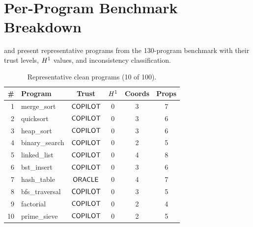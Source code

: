 \documentclass[11pt]{article}
\begin{document}
\appendix
\section{Per-Program Benchmark Breakdown}\label{app:benchmark}

 and 
present representative programs from the 130-program
benchmark with their trust levels, $H^{1}$ values,
and inconsistency classification.

\begin{table}[H]
\centering
\caption{Representative clean programs (10 of 100).}
\label{tab:benchmark-clean}
\small
\begin{tabular}{@{}rlcccc@{}}
\toprule
\textbf{\#} & \textbf{Program} & \textbf{Trust}
  & $H^{1}$ & \textbf{Coords} & \textbf{Props} \\
\midrule
1  & merge\_sort        & $\mathsf{COPILOT}$ & 0 & 3 & 7 \\
2  & quicksort          & $\mathsf{COPILOT}$ & 0 & 3 & 6 \\
3  & heap\_sort          & $\mathsf{COPILOT}$ & 0 & 3 & 6 \\
4  & binary\_search      & $\mathsf{COPILOT}$ & 0 & 2 & 5 \\
5  & linked\_list        & $\mathsf{COPILOT}$ & 0 & 4 & 8 \\
6  & bst\_insert         & $\mathsf{COPILOT}$ & 0 & 3 & 6 \\
7  & hash\_table         & $\mathsf{ORACLE}$  & 0 & 4 & 7 \\
8  & bfs\_traversal      & $\mathsf{COPILOT}$ & 0 & 3 & 5 \\
9  & factorial          & $\mathsf{COPILOT}$ & 0 & 2 & 4 \\
10 & prime\_sieve        & $\mathsf{COPILOT}$ & 0 & 2 & 5 \\
\bottomrule
\end{tabular}
\end{table}
\end{document}
